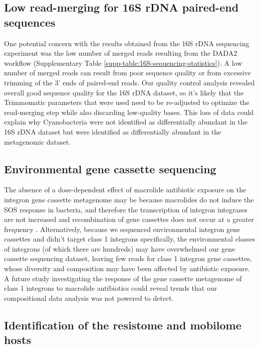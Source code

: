 \subsection{Low read-merging for 16S rDNA paired-end sequences}

One potential concern with the results obtained from the 16S rDNA sequencing experiment was the low number of merged reads resulting from the DADA2 workflow (Supplementary Table \ref{supp-table:16S-sequencing-statistics}).
A low number of merged reads can result from poor sequence quality or from excessive trimming of the 3' ends of paired-end reads.
Our quality control analysis revealed overall good sequence quality for the 16S rDNA dataset, so it's likely that the Trimmomatic parameters that were used need to be re-adjusted to optimize the read-merging step while also discarding low-quality bases.
This loss of data could explain why Cyanobacteria were not identified as differentially abundant in the 16S rDNA dataset but were identified as differentially abundant in the metagenomic dataset.

\subsection{Environmental gene cassette sequencing}

The absence of a dose-dependent effect of macrolide antibiotic exposure on the integron gene cassette metagenome may be because macrolides do not induce the SOS response in bacteria, and therefore the transcription of integron integrases are not increased and recombination of gene cassettes does not occur at a greater frequency \parencite{Baharoglu.2010}.
Alternatively, because we sequenced environmental integron gene cassettes and didn't target class 1 integrons specifically, the environmental classes of integrons (of which there are hundreds) may have overwhelmed our gene cassette sequencing dataset, leaving few reads for class 1 integron gene cassettes, whose diversity and composition may have been affected by antibiotic exposure.
A future study investigating the response of the gene cassette metagenome of class 1 integrons to macrolide antibiotics could reveal trends that our compositional data analysis was not powered to detect.

\subsection{Identification of the resistome and mobilome hosts}

